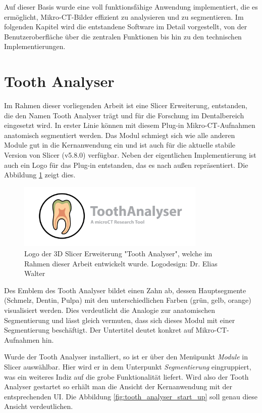 Auf dieser Basis wurde eine voll funktionsfähige Anwendung implementiert, die es
ermöglicht, Mikro-CT-Bilder effizient zu analysieren und zu segmentieren. Im
folgenden Kapitel wird die entstandene Software im Detail vorgestellt, von der Benutzeroberfläche
über die zentralen Funktionen bis hin zu den technischen Implementierungen.

\pagebreak

\section{Tooth Analyser}
\label{sec:tooth_analyser} Im Rahmen dieser vorliegenden Arbeit ist eine Slicer
Erweiterung, entstanden, die den Namen Tooth Analyser trägt und für die
Forschung im Dentalbereich eingesetzt wird. In erster Linie können mit diesem Plug-in
Mikro-\ac{CT}-Aufnahmen anatomisch segmentiert werden. Das Modul schmiegt sich wie
alle anderen Module gut in die Kernanwendung ein und ist auch für die aktuelle stabile
Version von Slicer (v5.8.0) verfügbar. Neben der eigentlichen Implementierung
ist auch ein Logo für das Plug-in entstanden, das es nach außen repräsentiert.
Die Abbildung \ref{fig:logo_tooth_analyser} zeigt dies.

\begin{figure}[h]
	\centering
	\includegraphics[width=0.8\textwidth]{img/SlicerToothAnalyser.png}
	\caption{Logo der 3D Slicer Erweiterung "Tooth Analyser", welche im Rahmen dieser
	Arbeit entwickelt wurde. Logodesign: Dr. Elias Walter}
	\label{fig:logo_tooth_analyser}
\end{figure}

Des Emblem des Tooth Analyser bildet einen Zahn ab, dessen Hauptsegmente (Schmelz,
Dentin, Pulpa) mit den unterschiedlichen Farben (grün, gelb, orange)
visualisiert werden. Dies verdeutlicht die Analogie zur anatomischen Segmentierung
und lässt gleich vermuten, dass sich dieses Modul mit einer Segmentierung
beschäftigt. Der Untertitel deutet konkret auf Mikro-\ac{CT}-Aufnahmen hin.

Wurde der Tooth Analyser installiert, so ist er über den Menüpunkt \textit{Module}
in Slicer auswählbar. Hier wird er in dem Unterpunkt \textit{Segmentierung}
eingruppiert, was ein weiteres Indiz auf die grobe Funktionalität liefert. Wird
also der Tooth Analyser gestartet so erhält man die Ansicht der Kernanwendung
mit der entsprechenden \ac{UI}. Die Abbildung \ref{fig:tooth_analyser_start_up}
soll genau diese Ansicht verdeutlichen.

